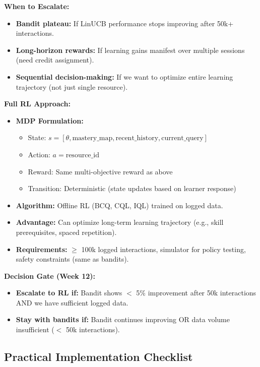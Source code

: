 \documentclass[11pt,letterpaper]{article}
\begin{document}
\textbf{When to Escalate:}
\begin{itemize}
\item \textbf{Bandit plateau:} If LinUCB performance stops improving after 50k+ interactions.
\item \textbf{Long-horizon rewards:} If learning gains manifest over multiple sessions (need credit assignment).
\item \textbf{Sequential decision-making:} If we want to optimize entire learning trajectory (not just single resource).
\end{itemize}

\textbf{Full RL Approach:}
\begin{itemize}
\item \textbf{MDP Formulation:}
\begin{itemize}
\item State: $s = [\theta, \text{mastery\_map}, \text{recent\_history}, \text{current\_query}]$
\item Action: $a = \text{resource\_id}$
\item Reward: Same multi-objective reward as above
\item Transition: Deterministic (state updates based on learner response)
\end{itemize}
\item \textbf{Algorithm:} Offline RL (BCQ, CQL, IQL) trained on logged data.
\item \textbf{Advantage:} Can optimize long-term learning trajectory (e.g., skill prerequisites, spaced repetition).
\item \textbf{Requirements:} $\geq$ 100k logged interactions, simulator for policy testing, safety constraints (same as bandits).
\end{itemize}

\textbf{Decision Gate (Week 12):}
\begin{itemize}
\item \textbf{Escalate to RL if:} Bandit shows $<$ 5\% improvement after 50k interactions AND we have sufficient logged data.
\item \textbf{Stay with bandits if:} Bandit continues improving OR data volume insufficient ($<$ 50k interactions).
\end{itemize}

\subsection{Practical Implementation Checklist}\label{subsec:implementation-checklist}
\end{document}
